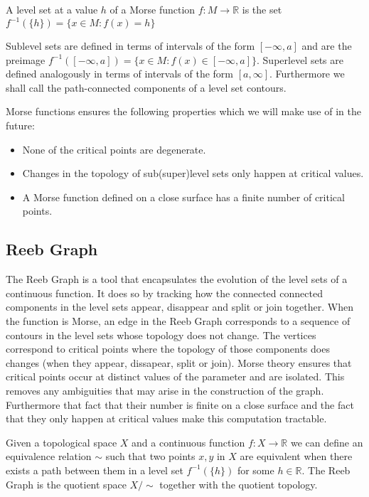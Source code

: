 \begin{defn} A level set at a value $h$ of a Morse function $f: M \to \mathbb{R}$ is the set $f^{-1}(\{h\}) = \{x \in M: f(x) = h \}$   \end{defn}

Sublevel sets are defined in terms of intervals of the form $[-\infty, a]$ and are the preimage $f^{-1}([-\infty, a]) = \{x \in M: f(x) \in [-\infty, a] \}$. Superlevel sets are defined analogously in terms of intervals of the form $[a, \infty]$. Furthermore we shall call the path-connected components of a level set contours.

Morse functions ensures the following properties which we will make use of in the future:

\begin{itemize}
    \item None of the critical points are degenerate.
    \item Changes in the topology of sub(super)level sets only happen at critical values. 
    \item A Morse function defined on a close surface has a finite number of critical points.
\end{itemize}

\subsection{Reeb Graph}


The Reeb Graph is a tool that encapsulates the evolution of the level sets of a continuous function. It does so by tracking how the connected connected components in the level sets appear, disappear and split or join together. When the function is Morse, an edge in the Reeb Graph corresponds to a sequence of contours in the level sets whose topology does not change. The vertices correspond to critical points where the topology of those components does changes (when they appear, dissapear, split or join). Morse theory ensures that critical points occur at distinct values of the parameter and are isolated. This removes any ambiguities that may arise in the construction of the graph. Furthermore that fact that their number is finite on a close surface and the fact that they only happen at critical values make this computation tractable.


\begin{defn}
Given a topological space $X$ and a continuous function $f: X \to \mathbb{R}$ we can define an equivalence relation $\sim$ such that two points $x, y$ in $X$ are equivalent when there exists a path between them in a level set $f^{-1}(\{h\})$ for some $h \in \mathbb{R}$. The Reeb Graph is the quotient space $X \big/ \sim$ together with the quotient topology.
\end{defn}

